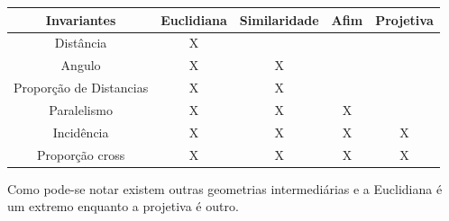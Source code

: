 \documentclass[a4paper]{sbgames}               %
\begin{document}
\begin{center}
\begin{tabular}{ c | c c c c }
\hline
 Invariantes & Euclidiana & Similaridade & Afim & Projetiva \\ 
 \hline
 Distância & X &  &  &  \\  
 Angulo & X & X &  &  \\  
 Proporção de Distancias & X & X &  &  \\  
 Paralelismo & X & X & X &  \\ 
 Incidência & X & X & X & X \\  
 Proporção cross & X & X & X & X \\  
\hline
\end{tabular}
\end{center}

Como pode-se notar existem outras geometrias intermediárias e a Euclidiana é um extremo enquanto a projetiva é outro.



\end{document}
